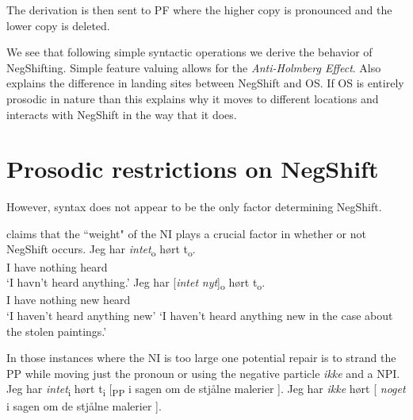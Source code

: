\documentclass[12pt, letterpaper]{article}
\begin{document}
\ex The derivation is then sent to PF where the higher copy is pronounced and the lower copy is deleted.

\ex We see that following simple syntactic operations we derive the behavior of NegShifting. 
	\ea Simple feature valuing allows for the \emph{Anti-Holmberg Effect}.
	\ex Also explains the difference in landing sites between NegShift and OS.
	\ex If OS is entirely prosodic in nature than this explains why it moves to different locations and interacts with NegShift in the way that it does.
	\z  
\z 

\section{Prosodic restrictions on NegShift} \label{sec:PROSODY}

\ea However, syntax does not appear to be the only factor determining NegShift.  

\ex \citet[65f]{christensenInterfacesNegationSyntax2005} claims that the ``weight" of the NI plays a crucial factor in whether or not NegShift occurs. 
	\ea 
	\gll Jeg har \textit{intet}\textsubscript{o} hørt t\textsubscript{o}.\\
	I have nothing heard\\
	\glt  `I havn't heard anything.'
	\ex 
	\gll Jeg har [\textit{intet} \textit{nyt}]\textsubscript{o} hørt t\textsubscript{o}.\\
	I have nothing new heard\\
	\glt `I haven't heard anything new'
	\glt `I haven't heard anything new in the case about the stolen paintings.'
	\z

\ex In those instances where the NI is too large one potential repair is to strand the PP while moving just the pronoun or using the negative particle \textit{ikke} and a NPI.
	\ea Jeg har \textit{intet}\textsubscript{i} hørt t\textsubscript{i} [\textsubscript{PP} i sagen om de stjålne malerier ].
	\ex Jeg har \textit{ikke} hørt [ \textit{noget} i sagen om de stjålne malerier ].
	\z 
 
\end{document}
